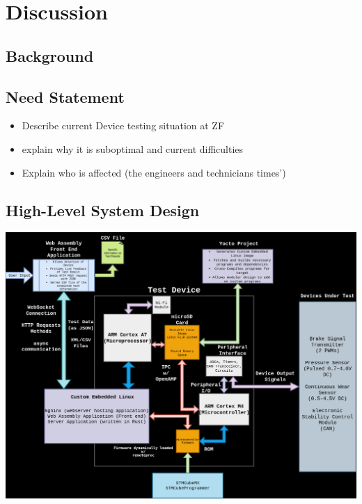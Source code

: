 \documentclass[12pt]{article}
\begin{document}
\section{Discussion}
\subsection{Background}


\subsection{Need Statement}
\begin{itemize}
  \item Describe current Device testing situation at ZF
  \item explain why it is suboptimal and current difficulties
  \item Explain who is affected (the engineers and technicians times')
\end{itemize}

\subsection{High-Level System Design}

\includegraphics[width=\textwidth]{../assets/block_diagram.png}
\end{document}
